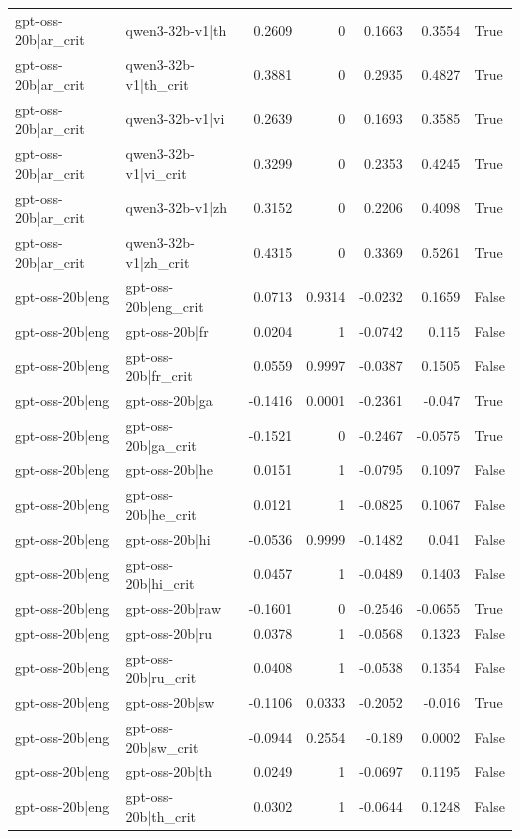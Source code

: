 \begin{table}
\begin{tabular}{l l r r r r l}
gpt-oss-20b|ar_crit & qwen3-32b-v1|th & 0.2609 & 0 & 0.1663 & 0.3554 & True \\
gpt-oss-20b|ar_crit & qwen3-32b-v1|th_crit & 0.3881 & 0 & 0.2935 & 0.4827 & True \\
gpt-oss-20b|ar_crit & qwen3-32b-v1|vi & 0.2639 & 0 & 0.1693 & 0.3585 & True \\
gpt-oss-20b|ar_crit & qwen3-32b-v1|vi_crit & 0.3299 & 0 & 0.2353 & 0.4245 & True \\
gpt-oss-20b|ar_crit & qwen3-32b-v1|zh & 0.3152 & 0 & 0.2206 & 0.4098 & True \\
gpt-oss-20b|ar_crit & qwen3-32b-v1|zh_crit & 0.4315 & 0 & 0.3369 & 0.5261 & True \\
gpt-oss-20b|eng & gpt-oss-20b|eng_crit & 0.0713 & 0.9314 & -0.0232 & 0.1659 & False \\
gpt-oss-20b|eng & gpt-oss-20b|fr & 0.0204 & 1 & -0.0742 & 0.115 & False \\
gpt-oss-20b|eng & gpt-oss-20b|fr_crit & 0.0559 & 0.9997 & -0.0387 & 0.1505 & False \\
gpt-oss-20b|eng & gpt-oss-20b|ga & -0.1416 & 0.0001 & -0.2361 & -0.047 & True \\
gpt-oss-20b|eng & gpt-oss-20b|ga_crit & -0.1521 & 0 & -0.2467 & -0.0575 & True \\
gpt-oss-20b|eng & gpt-oss-20b|he & 0.0151 & 1 & -0.0795 & 0.1097 & False \\
gpt-oss-20b|eng & gpt-oss-20b|he_crit & 0.0121 & 1 & -0.0825 & 0.1067 & False \\
gpt-oss-20b|eng & gpt-oss-20b|hi & -0.0536 & 0.9999 & -0.1482 & 0.041 & False \\
gpt-oss-20b|eng & gpt-oss-20b|hi_crit & 0.0457 & 1 & -0.0489 & 0.1403 & False \\
gpt-oss-20b|eng & gpt-oss-20b|raw & -0.1601 & 0 & -0.2546 & -0.0655 & True \\
gpt-oss-20b|eng & gpt-oss-20b|ru & 0.0378 & 1 & -0.0568 & 0.1323 & False \\
gpt-oss-20b|eng & gpt-oss-20b|ru_crit & 0.0408 & 1 & -0.0538 & 0.1354 & False \\
gpt-oss-20b|eng & gpt-oss-20b|sw & -0.1106 & 0.0333 & -0.2052 & -0.016 & True \\
gpt-oss-20b|eng & gpt-oss-20b|sw_crit & -0.0944 & 0.2554 & -0.189 & 0.0002 & False \\
gpt-oss-20b|eng & gpt-oss-20b|th & 0.0249 & 1 & -0.0697 & 0.1195 & False \\
gpt-oss-20b|eng & gpt-oss-20b|th_crit & 0.0302 & 1 & -0.0644 & 0.1248 & False \\

\end{tabular}
\end{table}

